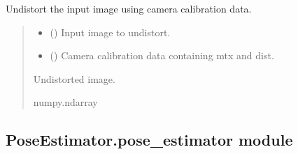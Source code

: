 \documentclass[letterpaper,10pt,english]{sphinxmanual}
\begin{document}
\begin{fulllineitems}
\label{\detokenize{PoseEstimator:PoseEstimator.camera_calibrator.undistort_image}}
\pysigstartsignatures
{}
\pysigstopsignatures
\sphinxAtStartPar
Undistort the input image using camera calibration data.
\begin{quote}\begin{description}
\begin{itemize}
\item {} 
\sphinxAtStartPar
{} () \textendash{} Input image to undistort.

\item {} 
\sphinxAtStartPar
{} () \textendash{} Camera calibration data containing mtx and dist.

\end{itemize}

\sphinxAtStartPar
Undistorted image.

\sphinxAtStartPar
numpy.ndarray

\end{description}\end{quote}

\end{fulllineitems}



\subsection{PoseEstimator.pose\_estimator module}
\label{\detokenize{PoseEstimator:module-PoseEstimator.pose_estimator}}\label{\detokenize{PoseEstimator:poseestimator-pose-estimator-module}}
\end{document}
